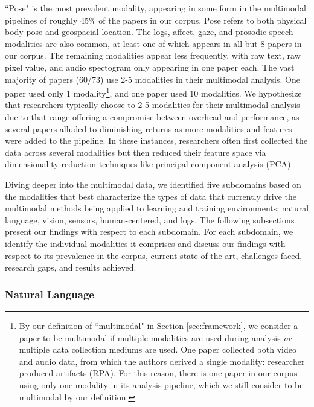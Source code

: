 \documentclass[manuscript,screen,review]{acmart}
\begin{document}
``Pose" is the most prevalent modality, appearing in some form in the multimodal pipelines of roughly 45\% of the papers in our corpus. Pose refers to both physical body pose and geospacial location. The logs, affect, gaze, and prosodic speech modalities are also common, at least one of which appears in all but 8 papers in our corpus. The remaining modalities appear less frequently, with raw text, raw pixel value, and audio spectogram only appearing in one paper each. The vast majority of papers (60/73) use 2-5 modalities in their multimodal analysis. One paper used only 1 modality\footnote{By our definition of ``multimodal" in Section \ref{sec:framework}, we consider a paper to be multimodal if multiple modalities are used during analysis \textit{or} multiple data collection mediums are used. One paper \cite{3809293172} collected both video and audio data, from which the authors derived a single modality: researcher produced artifacts (RPA). For this reason, there is one paper in our corpus using only one modality in its analysis pipeline, which we still consider to be multimodal by our definition.}, and one paper used 10 modalities. We hypothesize that researchers typically choose to 2-5 modalities for their multimodal analysis due to that range offering a compromise between overhead and performance, as several papers alluded to diminishing returns as more modalities and features were added to the pipeline. In these instances, researchers often first collected the data across several modalities but then reduced their feature space via dimensionality reduction techniques like principal component analysis (PCA). 

Diving deeper into the multimodal data, we identified five subdomains based on the modalities that best characterize the types of data that currently drive the multimodal methods being applied to learning and training environments: natural language, vision, sensors, human-centered, and logs. The following subsections present our findings with respect to each subdomain. For each subdomain, we identify the individual modalities it comprises and discuss our findings with respect to its prevalence in the corpus, current state-of-the-art, challenges faced, research gaps, and results achieved.

\subsubsection{Natural Language}
\end{document}
